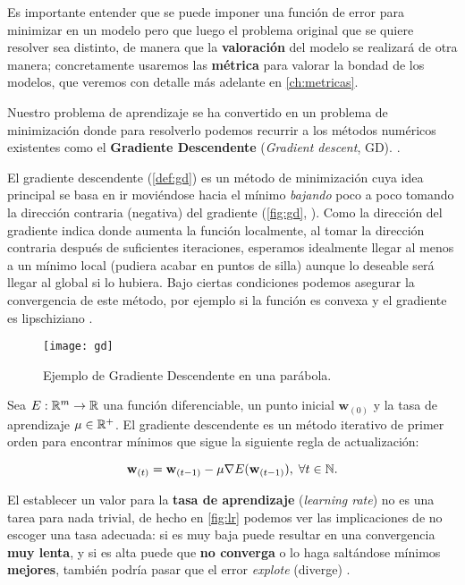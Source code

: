 Es importante entender que se puede imponer una función de error para minimizar en un modelo pero que luego el problema original que se quiere resolver sea distinto, de manera que la \textbf{valoración} del modelo se realizará de otra manera; concretamente usaremos las \textbf{métrica} para valorar la bondad de los modelos, que veremos con detalle más adelante en \autoref{ch:metricas}.

Nuestro problema de aprendizaje se ha convertido en un problema de minimización donde para resolverlo podemos recurrir a los métodos numéricos existentes como el \textbf{Gradiente Descendente} (\emph{Gradient descent}, GD). \cite{curry1944method}.

El gradiente descendente (\autoref{def:gd}) es un método de minimización cuya idea principal se basa en ir moviéndose hacia el mínimo \emph{bajando} poco a poco tomando la dirección contraria (negativa) del gradiente (\autoref{fig:gd}, \cite{molala2019sd}). Como la dirección del gradiente indica donde aumenta la función localmente, al tomar la dirección contraria después de suficientes iteraciones, esperamos idealmente llegar al menos a un mínimo local (pudiera acabar en puntos de silla) aunque lo deseable será llegar al global si lo hubiera. Bajo ciertas condiciones podemos asegurar la convergencia de este método, por ejemplo si la función es convexa y el gradiente es lipschiziano \cite{shalev2014understanding}.

\begin{figure}[htpb]
  \centering
  \texttt{[image: gd]}
  \caption{Ejemplo de Gradiente Descendente en una parábola.}
  \label{fig:gd}
\end{figure}

\begin{definicion}
  Sea $E : \mathbb{R}^m \to \mathbb{R}$ una función diferenciable, un punto inicial $\textbf{w}_{(0)}$ y la tasa de aprendizaje $\mu \in \mathbb{R}^+$. El gradiente descendente es un método iterativo de primer orden para encontrar mínimos que sigue la siguiente regla de actualización:

  $$\textbf{w}_{(t)} = \textbf{w}_{(t-1)} - \mu \nabla E(\textbf{w}_{(t-1)}), \; \forall t \in \mathbb{N}.$$
  \label{def:gd}
\end{definicion}

El establecer un valor para la \textbf{tasa de aprendizaje} (\emph{learning rate}) no es una tarea para nada trivial, de hecho en \autoref{fig:lr} podemos ver las implicaciones de no escoger una tasa adecuada: si es muy baja puede resultar en una convergencia \textbf{muy lenta}, y si es alta puede que \textbf{no converga} o lo haga saltándose mínimos \textbf{mejores}, también podría pasar que el error \emph{explote} (diverge) \cite{ruder2016overview}.

